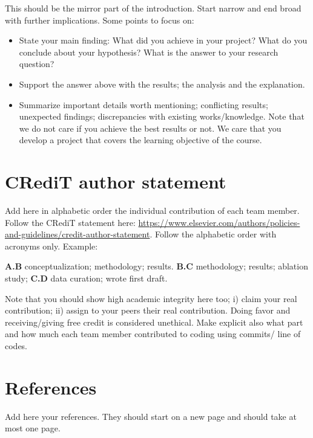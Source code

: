 \documentclass{article}
\begin{document}
This should be the mirror part of the introduction. Start narrow and end broad with further implications. Some points to focus on:
\begin{itemize}
    \item State your main finding: What did you achieve in your project? What do you conclude about your hypothesis? What is the answer to your research question?
    \item Support the answer above with the results; the analysis and the explanation.
    \item Summarize important details worth mentioning; conflicting results; unexpected findings; discrepancies with existing works/knowledge. Note that we do not care if you achieve the best results or not. We care that you develop a project that covers the learning objective of the course.
\end{itemize}

\section{CRediT author statement}

Add here in alphabetic order the individual contribution of each team member. Follow the CRediT statement here: \url{https://www.elsevier.com/authors/policies-and-guidelines/credit-author-statement}. Follow the alphabetic order with acronyms only. Example:

\textbf{A.B} conceptualization; methodology; results. \textbf{B.C} methodology; results; ablation study; \textbf{C.D} data curation; wrote first draft.

Note that you should show high academic integrity here too; i) claim your real contribution; ii) assign to your peers their real contribution. Doing favor and receiving/giving free credit is considered unethical. Make explicit also what part and how much each team member contributed to coding using commits/ line of codes.

\section*{References}

\medskip


{
\small

Add here your references. They should start on a new page and should take at most one page.

}

\end{document}
